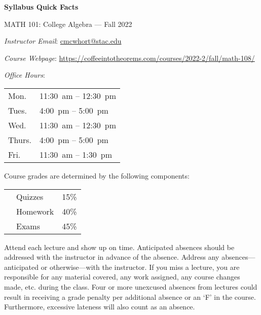 \documentclass[11pt,letterpaper]{article}
\begin{document}
\begin{center} 
\bfseries
\color{stacred}
\LARGE Syllabus Quick Facts \par\vspace{0.2\baselineskip}
\Large MATH 101: College Algebra --- Fall 2022 
\end{center} \pspace


\hspace{0.53cm} {\itshape Instructor Email}: \href{mailto:cmcwhort@stac.edu}{cmcwhort@stac.edu} \par
\hspace{0.53cm} {\itshape Course Webpage}: \href{https://coffeeintotheorems.com/courses/2022-2/fall/math-108/}{https://coffeeintotheorems.com/courses/2022-2/fall/math-108/} \par
\hspace{0.53cm} {\itshape Office Hours}: 	\par \vspace{-0.3cm}
	\begin{table}[!ht]
	\centering
	\begin{tabular}{l || l}
	Mon. & 11:30~am -- 12:30~pm \\
	Tues. & 4:00~pm -- 5:00~pm \\
	Wed. & 11:30~am -- 12:30~pm \\
	Thurs. & 4:00~pm -- 5:00~pm \\
	Fri. & 11:30~am -- 1:30~pm
	\end{tabular}
	\end{table}


Course grades are determined by the following components: \par \vspace{-0.3cm}
	\begin{table}[!ht]
        \begin{tabular}{clr}
	& Quizzes & 15\% \\
	& Homework & 40\% \\
	& Exams & 45\%
        \end{tabular} 
        \end{table}


Attend each lecture and show up on time. Anticipated absences should be addressed with the instructor in advance of the absence. Address any absences---anticipated or otherwise---with the instructor. If you miss a lecture, you are responsible for any material covered, any work assigned, any course changes made, etc. during the class. Four or more unexcused absences from lectures could result in receiving a grade penalty per additional absence or an `F' in the course. Furthermore, excessive lateness will also count as an absence. \pspace
\end{document}
